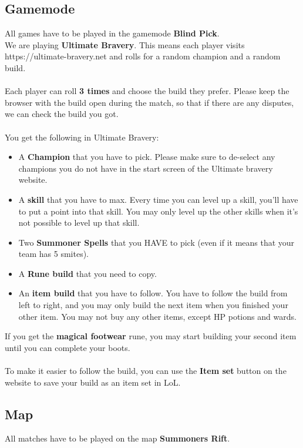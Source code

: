\documentclass{article}
\begin{document}
\subsection{Gamemode}
All games have to be played in the gamemode \textbf{Blind Pick}.
\\
We are playing \textbf{Ultimate Bravery}. This means each player visits https://ultimate-bravery.net and rolls for a random champion and a random build.
\\
\\
Each player can roll \textbf{3 times} and choose the build they prefer. Please keep the browser with the build open during the match, so that if there are any disputes, we can check the build you got.
\\
\\
You get the following in Ultimate Bravery:
\begin{itemize}
    \item A \textbf{Champion} that you have to pick. Please make sure to de-select any champions you do not have in the start screen of the Ultimate bravery website.
    \item A \textbf{skill} that you have to max. Every time you can level up a skill, you'll have to put a point into that skill. You may only level up the other skills when it's not possible to level up that skill.
    \item Two \textbf{Summoner Spells} that you HAVE to pick (even if it means that your team has 5 smites).
    \item A \textbf{Rune build} that you need to copy.
    \item An \textbf{item build} that you have to follow. You have to follow the build from left to right, and you may only build the next item when you finished your other item. You may not buy any other items, except HP potions and wards.
\end{itemize}

\noindent If you get the \textbf{magical footwear} rune, you may start building your second item until you can complete your boots.
\\
\\
\noindent To make it easier to follow the build, you can use the \textbf{Item set} button on the website to save your build as an item set in LoL.
\subsection{Map}
All matches have to be played on the map \textbf{Summoners Rift}.
\end{document}
